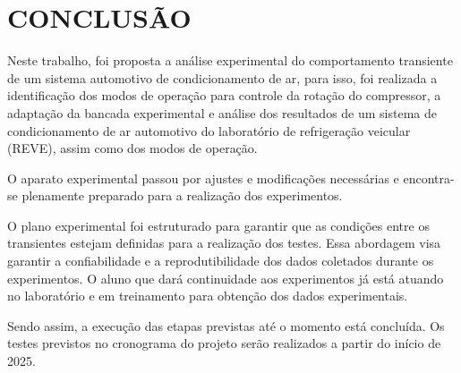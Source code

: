 \section{CONCLUSÃO}

Neste trabalho, foi proposta a análise experimental do comportamento transiente de um sistema automotivo de condicionamento de ar, para isso, foi realizada a identificação dos modos de operação para controle da rotação do compressor, a adaptação da bancada experimental e análise dos resultados de um sistema de condicionamento de ar automotivo do laboratório de refrigeração veicular (REVE), assim como dos modos de operação. 

O aparato experimental passou por ajustes e modificações necessárias e encontra-se plenamente preparado para a realização dos experimentos.

O plano experimental foi estruturado para garantir que as condições entre os transientes estejam definidas para a realização dos testes. Essa abordagem visa garantir a confiabilidade e a reprodutibilidade dos dados coletados durante os experimentos. O aluno que dará continuidade aos experimentos já está atuando no laboratório e em treinamento para obtenção dos dados experimentais.
    
Sendo assim, a execução das etapas previstas até o momento está concluída. Os testes previstos no cronograma do projeto serão realizados a partir do início de 2025.